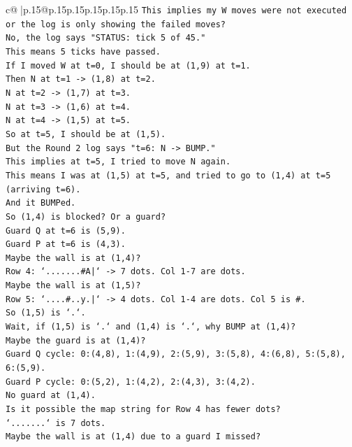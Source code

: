 \documentclass{article}
\begin{document}
{\begin{supertabular}{c@{$\;$}|p{.15\linewidth}@{}p{.15\linewidth}p{.15\linewidth}p{.15\linewidth}p{.15\linewidth}p{.15\linewidth}}
{{{\texttt{This implies my W moves were not executed or the log is only showing the failed moves?} \\
\texttt{No, the log says "STATUS: tick 5 of 45."} \\
\texttt{This means 5 ticks have passed.} \\
\texttt{If I moved W at t=0, I should be at (1,9) at t=1.} \\
\texttt{Then N at t=1 {-}> (1,8) at t=2.} \\
\texttt{N at t=2 {-}> (1,7) at t=3.} \\
\texttt{N at t=3 {-}> (1,6) at t=4.} \\
\texttt{N at t=4 {-}> (1,5) at t=5.} \\
\texttt{So at t=5, I should be at (1,5).} \\
\texttt{But the Round 2 log says "t=6: N {-}> BUMP."} \\
\texttt{This implies at t=5, I tried to move N again.} \\
\texttt{This means I was at (1,5) at t=5, and tried to go to (1,4) at t=5 (arriving t=6).} \\
\texttt{And it BUMPed.} \\
\texttt{So (1,4) is blocked? Or a guard?} \\
\texttt{Guard Q at t=6 is (5,9).} \\
\texttt{Guard P at t=6 is (4,3).} \\
\texttt{Maybe the wall is at (1,4)?} \\
\texttt{Row 4: `.......\#A|` {-}> 7 dots. Col 1{-}7 are dots.} \\
\texttt{Maybe the wall is at (1,5)?} \\
\texttt{Row 5: `....\#..y.|` {-}> 4 dots. Col 1{-}4 are dots. Col 5 is \#.} \\
\texttt{So (1,5) is `.`.} \\
\texttt{Wait, if (1,5) is `.` and (1,4) is `.`, why BUMP at (1,4)?} \\
\texttt{Maybe the guard is at (1,4)?} \\
\texttt{Guard Q cycle: 0:(4,8), 1:(4,9), 2:(5,9), 3:(5,8), 4:(6,8), 5:(5,8), 6:(5,9).} \\
\texttt{Guard P cycle: 0:(5,2), 1:(4,2), 2:(4,3), 3:(4,2).} \\
\texttt{No guard at (1,4).} \\
\texttt{Is it possible the map string for Row 4 has fewer dots?} \\
\texttt{`.......` is 7 dots.} \\
\texttt{Maybe the wall is at (1,4) due to a guard I missed?} \\
}}}
\end{supertabular}}
\end{document}
